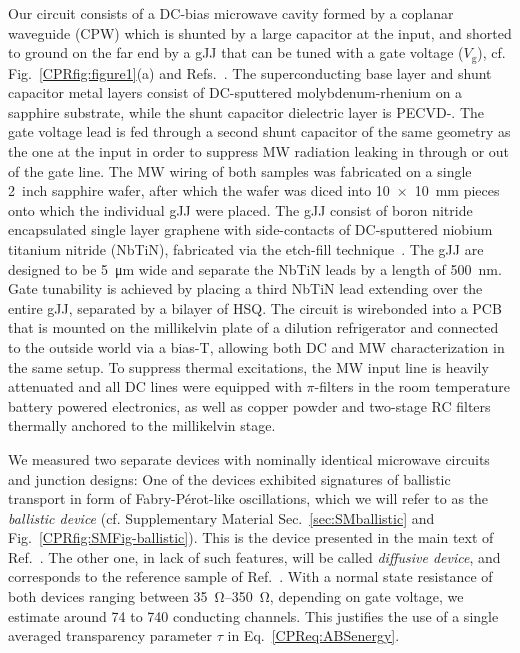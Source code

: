 Our circuit consists of a DC-bias microwave cavity formed by a coplanar waveguide (CPW) which is shunted by a large capacitor at the input, and shorted to ground on the far end by a gJJ that can be tuned with a gate voltage ($V_\text{g}$), cf. Fig.~\ref{CPRfig:figure1}(a) and Refs.~\cite{schmidtBallisticGrapheneSuperconducting2018,schmidtCurrentDetectionUsing2020,bosmanBroadbandArchitectureGalvanically2015c}.
%
The superconducting base layer and shunt capacitor metal layers consist of DC-sputtered molybdenum-rhenium on a sapphire substrate, while the shunt capacitor dielectric layer is PECVD-.
%
The gate voltage lead is fed through a second shunt capacitor of the same geometry as the one at the input in order to suppress MW radiation leaking in through or out of the gate line.
%
The MW wiring of both samples was fabricated on a single \SI{2}{inch} sapphire wafer, after which the wafer was diced into \SI{10x10}{\milli\meter} pieces onto which the individual gJJ were placed.
%
The gJJ consist of boron nitride encapsulated single layer graphene with side-contacts of DC-sputtered niobium titanium nitride (NbTiN), fabricated via the etch-fill technique~\cite{wangOneDimensionalElectricalContact2013b,schmidtBallisticGrapheneSuperconducting2018}.
%
The gJJ are designed to be \SI{5}{\micro\meter} wide and separate the NbTiN leads by a length of \SI{500}{\nano\meter}.
%
Gate tunability is achieved by placing a third NbTiN lead extending over the entire gJJ, separated by a bilayer of HSQ.
%
The circuit is wirebonded into a PCB that is mounted on the millikelvin plate of a dilution refrigerator and connected to the outside world via a bias-T, allowing both DC and MW characterization in the same setup.
%
To suppress thermal excitations, the MW input line is heavily attenuated and all DC lines were equipped with $\pi$-filters in the room temperature battery powered electronics, as well as copper powder and two-stage RC filters thermally anchored to the millikelvin stage.

We measured two separate devices with nominally identical microwave circuits and junction designs:
%
One of the devices exhibited signatures of ballistic transport in form of Fabry-Pérot-like oscillations, which we will refer to as the \textit{ballistic device} (cf. Supplementary Material Sec.~\ref{sec:SMballistic} and Fig.~\ref{CPRfig:SMFig-ballistic}).
%
This is the device presented in the main text of Ref.~\cite{schmidtBallisticGrapheneSuperconducting2018}.
%
The other one, in lack of such features, will be called \textit{diffusive device}, and corresponds to the reference sample of Ref.~\cite{schmidtBallisticGrapheneSuperconducting2018}.
%
With a normal state resistance of both devices ranging between \SIrange{35}{350}{\ohm}, depending on gate voltage, we estimate around 74 to 740 conducting channels.
%
This justifies the use of a single averaged transparency parameter $\tau$ in Eq.~\ref{CPReq:ABSenergy}.

